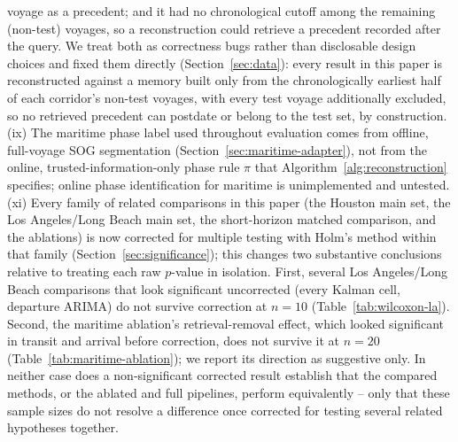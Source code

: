 voyage as a precedent; and it had no chronological cutoff among the
remaining (non-test) voyages, so a reconstruction could retrieve a
precedent recorded after the query. We treat both as correctness bugs
rather than disclosable design choices and fixed them directly
(Section~\ref{sec:data}): every result in this paper is reconstructed
against a memory built only from the chronologically earliest half of each
corridor's non-test voyages, with every test voyage additionally excluded,
so no retrieved precedent can postdate or belong to the test set, by
construction. (ix) The maritime phase label used throughout evaluation
comes from offline, full-voyage SOG segmentation
(Section~\ref{sec:maritime-adapter}), not from the online,
trusted-information-only phase rule $\pi$ that
Algorithm~\ref{alg:reconstruction} specifies; online phase identification
for maritime is unimplemented and untested. (xi) Every family of related
comparisons in this paper (the Houston main set, the Los Angeles/Long Beach
main set, the short-horizon matched comparison, and the ablations) is now
corrected for multiple testing with Holm's method within that family
(Section~\ref{sec:significance}); this changes two substantive conclusions
relative to treating each raw $p$-value in isolation. First, several
Los Angeles/Long Beach comparisons that look significant uncorrected
(every Kalman cell, departure ARIMA) do not survive correction at $n=10$
(Table~\ref{tab:wilcoxon-la}). Second, the maritime ablation's
retrieval-removal effect, which looked significant in transit and arrival
before correction, does not survive it at $n=20$
(Table~\ref{tab:maritime-ablation}); we report its direction as suggestive
only. In neither case does a non-significant corrected result establish
that the compared methods, or the ablated and full pipelines, perform
equivalently -- only that these sample sizes do not resolve a difference
once corrected for testing several related hypotheses together.
